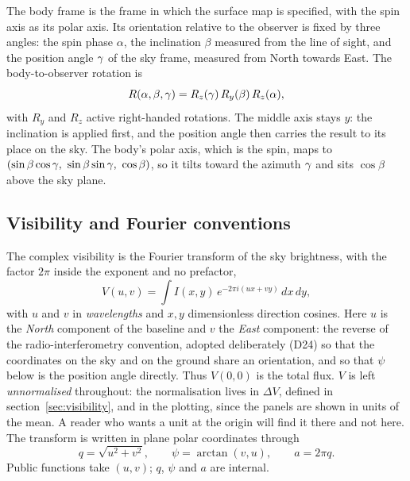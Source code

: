 The body frame is the frame in which the surface map is specified, with the spin axis as
its polar axis.  Its orientation relative to the observer is fixed by three
angles: the spin phase $\alpha$, the inclination $\beta$ measured from the line
of sight, and the position angle $\gamma$ of the sky frame, measured from North towards East.  The
body-to-observer rotation is
\begin{equation}
  R(\alpha,\beta,\gamma) =
  R_z(\gamma)\, R_y(\beta)\, R_z(\alpha),
  \label{eq:body-to-observer}
\end{equation}
with $R_y$ and $R_z$ active right-handed rotations.  The middle axis stays $y$:
the inclination is applied first, and the position angle then carries the result to
its place on the sky.  The body's polar axis, which is the spin, maps to
$(\sin\beta\cos\PA,\ \sin\beta\sin\PA,\ \cos\beta)$, so it tilts toward the azimuth
$\gamma$ and sits $\cos\beta$ above the sky plane.

\subsection{Visibility and Fourier conventions}

The complex visibility is the Fourier transform of the sky brightness, with the
factor $2\pi$ inside the exponent and no prefactor,
\begin{equation}
  V(u,v) = \int I(x,y)\, e^{-2\pi i (u x + v y)}\, dx\, dy ,
  \label{eq:visibility-definition}
\end{equation}
with $u$ and $v$ in \emph{wavelengths} and $x, y$ dimensionless direction
cosines.  Here $u$ is the \emph{North} component of the baseline and $v$ the
\emph{East} component: the reverse of the radio-interferometry convention, adopted
deliberately (D24) so that the coordinates on the sky and on the ground share an
orientation, and so that $\psi$ below is the position angle directly.  Thus
$V(0,0)$ is the total flux.  $V$ is left \emph{unnormalised} throughout: the normalisation
lives in $\Delta V$, defined in section~\ref{sec:visibility}, and in the plotting, since the
panels are shown in units of the mean.  A reader who wants a unit at the origin will find it
there and not here.  The transform is written in plane polar coordinates
through
\begin{equation}
  q = \sqrt{u^2 + v^2}, \qquad \psi = \arctan(v,u), \qquad a = 2\pi q .
  \label{eq:uv-polar}
\end{equation}
Public functions take $(u,v)$; $q$, $\psi$ and $a$ are internal.

